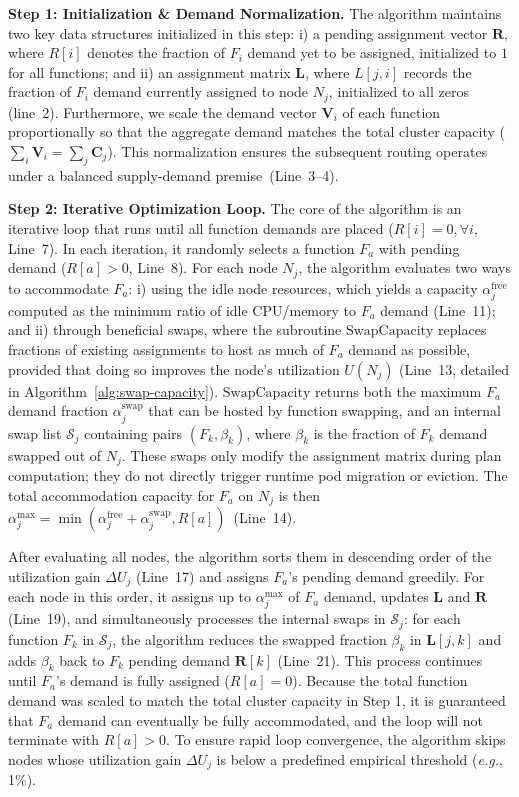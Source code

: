\textbf{Step 1: Initialization \& Demand Normalization.}
The algorithm maintains two key data structures initialized in this step: i) a 
pending assignment vector $\mathbf{R}$, where $R[i]$ denotes the fraction of 
$F_i$ demand yet to be assigned, initialized to $1$ for all functions; and ii) an 
assignment matrix $\mathbf{L}$, where $L[j,i]$ records the fraction of $F_i$ 
demand currently assigned to node $N_j$, initialized to all zeros (line~2). 
Furthermore, we scale the demand vector $\mathbf{V}_i$ of each function 
proportionally so that the aggregate demand matches the total cluster capacity 
($\sum_i \mathbf{V}_i = \sum_j \mathbf{C}_j$). This normalization ensures the 
subsequent routing operates under a balanced supply-demand premise~(Line~3--4). 

\textbf{Step 2: Iterative Optimization Loop.}
The core of the algorithm is an iterative loop that runs until all function demands 
are placed ($R[i]=0, \forall i$, Line~7). In each iteration, it randomly selects 
a function $F_a$ with pending demand ($R[a] > 0$, Line~8). For each node $N_j$, 
the algorithm evaluates two ways to accommodate $F_a$: i) using the idle node 
resources, which yields a capacity $\alpha_j^{\text{free}}$ computed as the 
minimum ratio of idle CPU/memory to $F_a$ demand (Line~11); and ii) through 
beneficial swaps, where the subroutine $\text{SwapCapacity}$ replaces
fractions of existing assignments to host as much of $F_a$ demand as possible,
provided that doing so improves the node's utilization $U(N_j)$ (Line~13, detailed
in Algorithm~\ref{alg:swap-capacity}). $\text{SwapCapacity}$ returns both the 
maximum $F_a$ demand fraction $\alpha_j^{\text{swap}}$ that can be hosted by 
function swapping, and an internal swap list $\mathcal{S}_j$ containing pairs
$(F_k,\beta_k)$, where $\beta_k$ is the fraction of $F_k$ demand swapped out of
$N_j$. These swaps only modify the assignment matrix during plan computation;
they do not directly trigger runtime pod migration or eviction. The total accommodation capacity for $F_a$ on 
$N_j$ is then $\alpha_j^{\text{max}} = \min(\alpha_j^{\text{free}}+\alpha_j^{\text{swap}}, R[a])$~(Line~14).

After evaluating all nodes, the algorithm sorts them in descending order of the 
utilization gain $\Delta U_j$ (Line~17) and assigns $F_a$'s pending demand greedily.
For each node in this order, it assigns up to $\alpha_j^{\text{max}}$ of $F_a$ demand, 
updates $\mathbf{L}$ and $\mathbf{R}$ (Line~19), and simultaneously processes 
the internal swaps in $\mathcal{S}_j$: for each function $F_k$ in $\mathcal{S}_j$, 
the algorithm reduces the swapped fraction $\beta_k$ in $\mathbf{L}[j, k]$ and 
adds $\beta_k$ back to $F_k$ pending demand $\mathbf{R}[k]$ (Line~21). This process 
continues until $F_a$'s demand is fully assigned ($R[a]=0$). Because the total
function demand was scaled to match the total cluster capacity in Step 1, it is 
guaranteed that $F_a$ demand can eventually be fully accommodated, and the loop 
will not terminate with $R[a] > 0$. To ensure rapid loop convergence, the
algorithm skips nodes whose utilization gain $\Delta U_j$ is below a predefined 
empirical threshold (\emph{e.g.}, 1\%).

